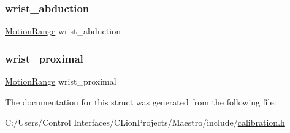 \subsubsection{\texorpdfstring{wrist\+\_\+abduction}{wrist\_abduction}}
{\footnotesize\ttfamily \hyperlink{struct_motion_range}{Motion\+Range} wrist\+\_\+abduction}

\mbox{\label{struct_motion_ranges_context_a556762ae0bb1f0c5a24b9fdd89e1ea11}} 
\subsubsection{\texorpdfstring{wrist\+\_\+proximal}{wrist\_proximal}}
{\footnotesize\ttfamily \hyperlink{struct_motion_range}{Motion\+Range} wrist\+\_\+proximal}



The documentation for this struct was generated from the following file\+:\begin{DoxyCompactItemize}
\item 
C\+:/\+Users/\+Control Interfaces/\+C\+Lion\+Projects/\+Maestro/include/\hyperlink{calibration_8h}{calibration.\+h}\end{DoxyCompactItemize}
